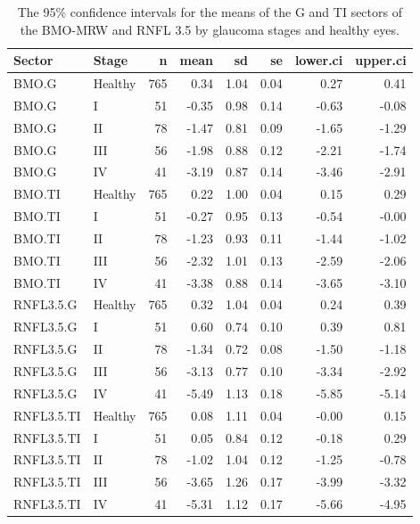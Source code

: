 \documentclass[jcm,article,submit,moreauthors,pdftex]{Definitions/mdpi}
\begin{document}
\begin{table}[ht]
\caption{The 95\% confidence intervals for the means of the G and TI sectors of the BMO-MRW and RNFL 3.5 by glaucoma stages and healthy eyes.}
\label{tab:conficende-intervals}
\centering
\begin{tabular}{llrrrrrr}
\toprule
\bf Sector & \bf Stage & \bf n & \bf mean & \bf sd & \bf se & \bf lower.ci & \bf upper.ci \\ 
\midrule
BMO.G & Healthy & 765 & 0.34 & 1.04 & 0.04 & 0.27 & 0.41 \\ 
BMO.G & I &  51 & -0.35 & 0.98 & 0.14 & -0.63 & -0.08 \\ 
BMO.G & II &  78 & -1.47 & 0.81 & 0.09 & -1.65 & -1.29 \\ 
BMO.G & III &  56 & -1.98 & 0.88 & 0.12 & -2.21 & -1.74 \\ 
BMO.G & IV &  41 & -3.19 & 0.87 & 0.14 & -3.46 & -2.91 \\ 
BMO.TI & Healthy & 765 & 0.22 & 1.00 & 0.04 & 0.15 & 0.29 \\ 
BMO.TI & I &  51 & -0.27 & 0.95 & 0.13 & -0.54 & -0.00 \\ 
BMO.TI & II &  78 & -1.23 & 0.93 & 0.11 & -1.44 & -1.02 \\ 
BMO.TI & III &  56 & -2.32 & 1.01 & 0.13 & -2.59 & -2.06 \\ 
BMO.TI & IV &  41 & -3.38 & 0.88 & 0.14 & -3.65 & -3.10 \\ 
RNFL3.5.G & Healthy & 765 & 0.32 & 1.04 & 0.04 & 0.24 & 0.39 \\ 
RNFL3.5.G & I &  51 & 0.60 & 0.74 & 0.10 & 0.39 & 0.81 \\ 
RNFL3.5.G & II &  78 & -1.34 & 0.72 & 0.08 & -1.50 & -1.18 \\ 
RNFL3.5.G & III &  56 & -3.13 & 0.77 & 0.10 & -3.34 & -2.92 \\ 
RNFL3.5.G & IV &  41 & -5.49 & 1.13 & 0.18 & -5.85 & -5.14 \\ 
RNFL3.5.TI & Healthy & 765 & 0.08 & 1.11 & 0.04 & -0.00 & 0.15 \\ 
RNFL3.5.TI & I &  51 & 0.05 & 0.84 & 0.12 & -0.18 & 0.29 \\ 
RNFL3.5.TI & II &  78 & -1.02 & 1.04 & 0.12 & -1.25 & -0.78 \\ 
RNFL3.5.TI & III &  56 & -3.65 & 1.26 & 0.17 & -3.99 & -3.32 \\ 
RNFL3.5.TI & IV &  41 & -5.31 & 1.12 & 0.17 & -5.66 & -4.95 \\ 
\bottomrule
\end{tabular}
\end{table}
\end{document}

